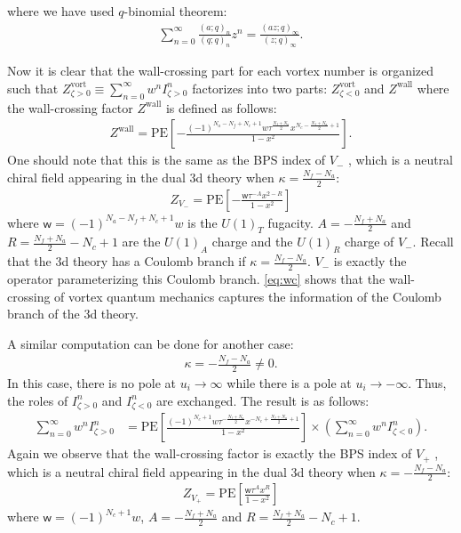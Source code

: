 \documentclass[a4paper,11pt]{article}
\begin{document}
where we have used $q$-binomial theorem:
\begin{align}
\sum_{n = 0}^\infty \frac{(a;q)_n}{(q;q)_n} z^n = \frac{(a z;q)_\infty}{(z;q)_\infty}.
\end{align}

Now it is clear that the wall-crossing part for each vortex number is organized such that $Z^\text{vort}_{\zeta > 0} \equiv \sum_{n = 0}^\infty w^n I^n_{\zeta > 0}$ factorizes into two parts: $Z^\text{vort}_{\zeta < 0}$ and $Z^\text{wall}$ where the wall-crossing factor $Z^\text{wall}$ is defined as follows:
\begin{align}
\label{eq:wc}
Z^\text{wall} = \mathrm{PE}\left[-\frac{(-1)^{N_a-N_f+N_c+1} w \tau^{\frac{N_f+N_a}{2}} x^{N_c-\frac{N_f+N_a}{2}+1}}{1-x^2}\right].
\end{align}
One should note that this is the same as the BPS index of $V_-$ \cite{Hwang:2012jh,Hwang:2015wna}, which is a neutral chiral field appearing in the dual 3d theory when $\kappa = \frac{N_f-N_a}{2}$:
\begin{align}
\label{eq:V-}
Z_{V_-} = \mathrm{PE} \left[-\frac{\mathsf w \tau^{-A} x^{2-R}}{1-x^2}\right]
\end{align}
where $\mathsf w = (-1)^{N_a-N_f+N_c+1} w$ is the $U(1)_T$ fugacity. $A = -\frac{N_f+N_a}{2}$ and $R = \frac{N_f+N_a}{2}-N_c+1$ are the $U(1)_A$ charge and the $U(1)_R$ charge of $V_-$. Recall that the 3d theory has a Coulomb branch if $\kappa = \frac{N_f-N_a}{2}$. $V_-$ is exactly the operator parameterizing this Coulomb branch. \eqref{eq:wc} shows that the wall-crossing of vortex quantum mechanics captures the information of the Coulomb branch of the 3d theory.

A similar computation can be done for another case:
\begin{align}
\kappa = -\frac{N_f-N_a}{2} \neq 0.
\end{align}
In this case, there is no pole at $u_i \rightarrow \infty$ while there is a pole at $u_i \rightarrow -\infty$. Thus, the roles of $I^n_{\zeta > 0}$ and $I^n_{\zeta < 0}$ are exchanged. The result is as follows:
\begin{align}
\label{eq:wc-}
\sum_{n = 0}^\infty w^n I^n_{\zeta > 0}
&= \mathrm{PE}\left[\frac{(-1)^{N_c+1} w \tau^{-\frac{N_f+N_a}{2}} x^{-N_c+\frac{N_f+N_a}{2}+1}}{1-x^2}\right] \times \left(\sum_{n = 0}^\infty w^n I^n_{\zeta < 0}\right).
\end{align}
Again we observe that the wall-crossing factor is exactly the BPS index of $V_+$ \cite{Hwang:2012jh,Hwang:2015wna}, which is a neutral chiral field appearing in the dual 3d theory when $\kappa = -\frac{N_f-N_a}{2}$:
\begin{align}
\label{eq:V+}
Z_{V_+} = \mathrm{PE} \left[\frac{\mathsf w \tau^A x^R}{1-x^2}\right]
\end{align}
where $\mathsf w = (-1)^{N_c+1} w$, $A = -\frac{N_f+N_a}{2}$ and $R = \frac{N_f+N_a}{2}-N_c+1$.
\end{document}

